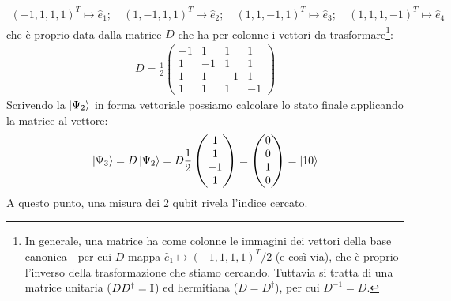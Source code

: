 \documentclass[../../InformazioneQuantistica.tex]{subfiles}
\begin{document}
\begin{align*}
    (-1,1,1,1)^T \mapsto \hat{e}_1; \quad (1,-1,1,1)^T \mapsto \hat{e}_2; \quad (1,1,-1,1)^T \mapsto \hat{e}_3; \quad (1,1,1,-1)^T \mapsto \hat{e}_4
\end{align*}
che è proprio data dalla matrice $D$ che ha per colonne i vettori da trasformare\footnote{In generale, una matrice ha come colonne le immagini dei vettori della base canonica - per cui $D$ mappa $\hat{e}_1 \mapsto (-1,1,1,1)^T/2$ (e così via), che è proprio l'inverso della trasformazione che stiamo cercando. Tuttavia si tratta di una matrice unitaria ($DD^\dag = \mathbb{I}$) ed hermitiana ($D=D^\dag$), per cui $D^{-1} = D$.}:
\begin{align*}
D = \frac{1}{2}\left(
\begin{array}{cc|cc}
-1 & 1 & 1 & 1\\
1 & -1 & 1 & 1\\ \hline
1 & 1 & -1 & 1\\
1 & 1 & 1 & -1
\end{array}
\right)
\end{align*}
Scrivendo la $\Ket{\Psi_2}$ in forma vettoriale possiamo calcolare lo stato finale applicando la matrice al vettore:
\begin{align*}
\Ket{\Psi_3} = D \Ket{\Psi_2} = D \frac{1}{2}\begin{pmatrix}1\\ 1 \\ -1 \\ 1 \end{pmatrix} = \begin{pmatrix}0\\ 0\\ 1 \\ 0\end{pmatrix} = \Ket{10}
\end{align*}
A questo punto, una misura dei $2$ qubit rivela l'indice cercato.\\
\end{document}
